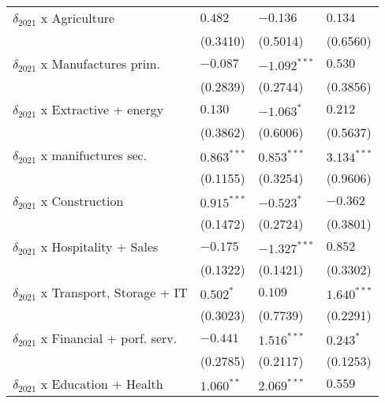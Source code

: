 \begin{table}[h!]
{{\begin{tabular}{llll}
$\delta_{2021}$ x Agriculture                      &            $0.482$ &           $-0.136$ &            $0.134$ \\
                                                   &           (0.3410) &           (0.5014) &           (0.6560) \\
$\delta_{2021}$ x Manufactures prim.               &           $-0.087$ &     $-1.092^{***}$ &            $0.530$ \\
                                                   &           (0.2839) &           (0.2744) &           (0.3856) \\
$\delta_{2021}$ x Extractive + energy              &            $0.130$ &         $-1.063^*$ &            $0.212$ \\
                                                   &           (0.3862) &           (0.6006) &           (0.5637) \\
$\delta_{2021}$ x manifuctures sec.                &      $0.863^{***}$ &      $0.853^{***}$ &      $3.134^{***}$ \\
                                                   &           (0.1155) &           (0.3254) &           (0.9606) \\
$\delta_{2021}$ x Construction                     &      $0.915^{***}$ &         $-0.523^*$ &           $-0.362$ \\
                                                   &           (0.1472) &           (0.2724) &           (0.3801) \\
$\delta_{2021}$ x Hospitality + Sales              &           $-0.175$ &     $-1.327^{***}$ &            $0.852$ \\
                                                   &           (0.1322) &           (0.1421) &           (0.3302) \\
$\delta_{2021}$ x Transport, Storage + IT          &          $0.502^*$ &            $0.109$ &      $1.640^{***}$ \\
                                                   &           (0.3023) &           (0.7739) &           (0.2291) \\
$\delta_{2021}$ x Financial + porf. serv.          &           $-0.441$ &      $1.516^{***}$ &          $0.243^*$ \\
                                                   &           (0.2785) &           (0.2117) &           (0.1253) \\
$\delta_{2021}$ x Education + Health               &       $1.060^{**}$ &      $2.069^{***}$ &            $0.559$ \\

\end{tabular}}}
\end{table}

